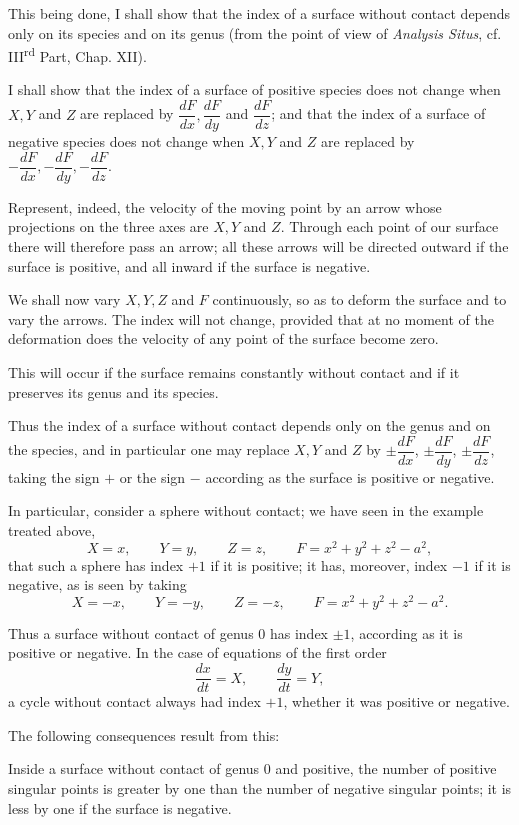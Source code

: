 \documentclass[11pt]{article}
\begin{document}
This being done, I shall show that the index of a surface without contact depends only on its species and on its genus (from the point of view of \emph{Analysis Situs}, cf. III\textsuperscript{rd} Part, Chap. XII).

I shall show that the index of a surface of positive species does not change when $X,Y$ and $Z$ are replaced by $\dfrac{dF}{dx},\dfrac{dF}{dy}$ and $\dfrac{dF}{dz}$; and that the index of a surface of negative species does not change when $X,Y$ and $Z$ are replaced by $-\dfrac{dF}{dx},-\dfrac{dF}{dy},-\dfrac{dF}{dz}$.

Represent, indeed, the velocity of the moving point by an arrow whose projections on the three axes are $X,Y$ and $Z$. Through each point of our surface there will therefore pass an arrow; all these arrows will be directed outward if the surface is positive, and all inward if the surface is negative.

We shall now vary $X,Y,Z$ and $F$ continuously, so as to deform the surface and to vary the arrows. The index will not change, provided that at no moment of the deformation does the velocity of any point of the surface become zero.

This will occur if the surface remains constantly without contact and if it preserves its genus and its species.

Thus the index of a surface without contact depends only on the genus and on the species, and in particular one may replace $X,Y$ and $Z$ by $\pm\dfrac{dF}{dx}$, $\pm\dfrac{dF}{dy}$, $\pm\dfrac{dF}{dz}$, taking the sign $+$ or the sign $-$ according as the surface is positive or negative.

In particular, consider a sphere without contact; we have seen in the example treated above,
\[
X=x,\qquad Y=y,\qquad Z=z,
\qquad F=x^2+y^2+z^2-a^2,
\]
that such a sphere has index $+1$ if it is positive; it has, moreover, index $-1$ if it is negative, as is seen by taking
\[
X=-x,
\qquad Y=-y,
\qquad Z=-z,
\qquad F=x^2+y^2+z^2-a^2.
\]

Thus a surface without contact of genus 0 has index $\pm1$, according as it is positive or negative. In the case of equations of the first order
\[
\frac{dx}{dt}=X,
\qquad \frac{dy}{dt}=Y,
\]
a cycle without contact always had index $+1$, whether it was positive or negative.

The following consequences result from this:

Inside a surface without contact of genus 0 and positive, the number of positive singular points is greater by one than the number of negative singular points; it is less by one if the surface is negative.
\end{document}
